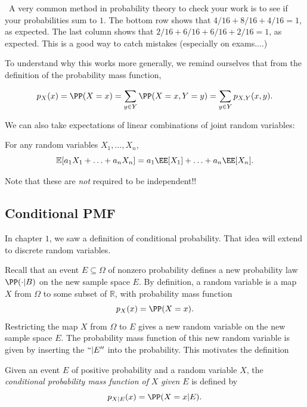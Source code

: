 \documentclass{ximera}
\begin{document}
\Lightning \Lightning \ A very common method in probability theory to check your work is to see if your probabilities sum to $1$. The bottom row shows that $4/16+8/16+4/16=1$, as expected. The last column shows that $2/16+6/16+6/16+2/16=1$, as expected. This is a good way to catch mistakes (especially on exams....) \Lightning \Lightning

To understand why this works more generally, we remind ourselves that from the definition of the probability mass function,

$$
p_X(x) = \PP(X=x) = \sum_{y \in Y} \PP(X=x,Y=y) = \sum_{y\in Y} p_{X,Y}(x,y).
$$

We can also take expectations of linear combinations of joint random variables:

\begin{theorem}
For any random variables $X_1,\ldots,X_n$,
$$
\mathbb{E}[a_1 X_1 + \ldots + a_nX_n] = a_1 \EE[X_1] + \ldots + a_n \EE[X_n].
$$
\end{theorem}

Note that these are \textit{not} required to be independent!!

\newpage



\subsection{Conditional PMF}
In chapter $1$, we saw a definition of conditional probability. That idea will extend to discrete random variables. 

Recall that an event $E\subseteq \Omega$ of nonzero probability defines a new probability law $\PP(\cdot \vert B)$ on the new sample space $E$. By definition, a random variable is a map $X$ from $\Omega$ to some subset of $\mathbb{R}$, with probability mass function 
$$
p_X(x) = \PP(X=x).
$$
Restricting the map $X$ from $\Omega$ to $E$ gives a new random variable on the new sample space $E$. The probability mass function of this new random variable is given by inserting the $ `` \vert E''$ into the probability. This motivates the definition
\begin{definition}
Given an event $E$ of positive probability and a random variable $X$, the \textit{conditional probability mass function of} $X$ \textit{given} $E$ is defined by 
$$
p_{X\vert E}(x) = \PP(X = x \vert E). 
$$
\end{definition}
\end{document}
